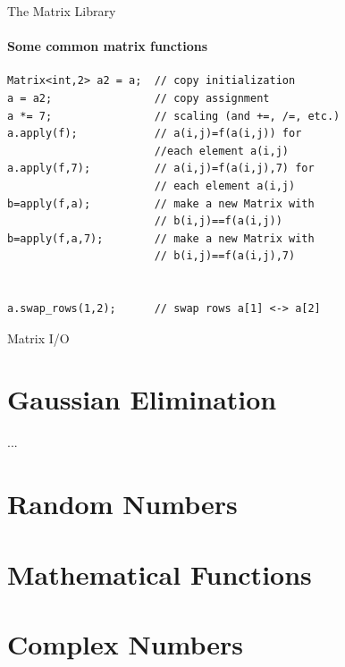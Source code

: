 \documentclass[presentation]{beamer}
\begin{document}
\begin{frame}[fragile]{The Matrix Library}
\framesubtitle{Some common matrix functions}


\begin{lstlisting}
Matrix<int,2> a2 = a;  // copy initialization
a = a2;                // copy assignment
a *= 7;                // scaling (and +=, /=, etc.)
a.apply(f);            // a(i,j)=f(a(i,j)) for
                       //each element a(i,j)
a.apply(f,7);          // a(i,j)=f(a(i,j),7) for
                       // each element a(i,j)
b=apply(f,a);          // make a new Matrix with
                       // b(i,j)==f(a(i,j))
b=apply(f,a,7);        // make a new Matrix with
                       // b(i,j)==f(a(i,j),7)


a.swap_rows(1,2);      // swap rows a[1] <-> a[2]
\end{lstlisting}


\end{frame}

\begin{frame}{Matrix I/O}
\framesubtitle{}



\end{frame}

\section{Gaussian Elimination}

\begin{frame}{...}
\framesubtitle{}



\end{frame}


\section{Random Numbers}


\section{Mathematical Functions}


\section{Complex Numbers}
\end{document}
